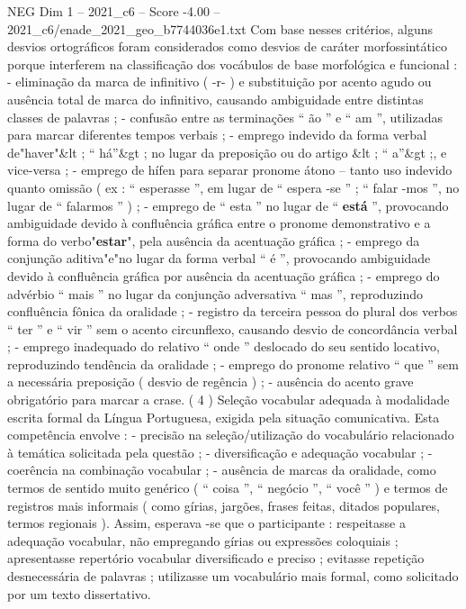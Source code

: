 \begin{textsample}{NEG Dim 1 – 2021\_c6 – Score -4.00 – 2021\_c6/enade\_2021\_geo\_b7744036e1.txt}
Com base nesses critérios, alguns desvios ortográficos foram considerados como desvios de caráter morfossintático porque interferem na classificação dos vocábulos de base morfológica e funcional : - eliminação da marca de infinitivo ( -r- ) e substituição por acento agudo ou ausência total de marca do infinitivo, causando ambiguidade entre distintas classes de palavras ; - confusão entre as terminações “ ão ” e “ am ”, utilizadas para marcar diferentes tempos verbais ; - emprego indevido da forma verbal de"haver"\&lt ; “ há”\&gt ; no lugar da preposição ou do artigo \&lt ; “ a”\&gt ;, e vice-versa ; - emprego de hífen para separar pronome átono – tanto uso indevido quanto omissão ( ex : “ esperasse ”, em lugar de “ espera -se ” ; “ falar -mos ”, no lugar de “ falarmos ” ) ; - emprego de “ esta ” no lugar de “ \textbf{está} ”, provocando ambiguidade devido à confluência gráfica entre o pronome demonstrativo e a forma do verbo"\textbf{estar}", pela ausência da acentuação gráfica ; - emprego da conjunção aditiva"e"no lugar da forma verbal “ é ”, provocando ambiguidade devido à confluência gráfica por ausência da acentuação gráfica ; - emprego do advérbio “ mais ” no lugar da conjunção adversativa “ mas ”, reproduzindo confluência fônica da oralidade ; - registro da terceira pessoa do plural dos verbos “ ter ” e “ vir ” sem o acento circunflexo, causando desvio de concordância verbal ; - emprego inadequado do relativo “ onde ” deslocado do seu sentido locativo, reproduzindo tendência da oralidade ; - emprego do pronome relativo “ que ” sem a necessária preposição ( desvio de regência ) ; - ausência do acento grave obrigatório para marcar a crase. ( 4 ) Seleção vocabular adequada à modalidade escrita formal da Língua Portuguesa, exigida pela situação comunicativa.
Esta competência envolve : - precisão na seleção/utilização do vocabulário relacionado à temática solicitada pela questão ; - diversificação e adequação vocabular ; - coerência na combinação vocabular ; - ausência de marcas da oralidade, como termos de sentido muito genérico ( “ coisa ”, “ negócio ”, “ você ” ) e termos de registros mais informais ( como gírias, jargões, frases feitas, ditados populares, termos regionais ).
Assim, esperava -se que o participante : respeitasse a adequação vocabular, não empregando gírias ou expressões coloquiais ; apresentasse repertório vocabular diversificado e preciso ; evitasse repetição desnecessária de palavras ; utilizasse um vocabulário mais formal, como solicitado por um texto dissertativo.

\end{textsample}
